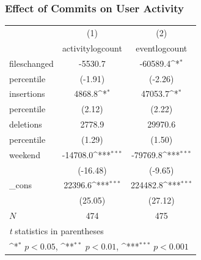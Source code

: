 \documentclass[xcolor=pdftex,dvipsnames,table]{beamer}
\begin{document}
\frame
{
    \frametitle{Effect of Commits on User Activity}
    \begin{table}
    \scriptsize
    \centering
    {
        \def\sym#1{\ifmmode^{#1}\else\(^{#1}\)\fi}
        \begin{tabular}{l*{2}{c}}
        \hline\hline
            &\multicolumn{1}{c}{(1)}&\multicolumn{1}{c}{(2)}\\
            &\multicolumn{1}{c}{activitylogcount}&\multicolumn{1}{c}{eventlogcount}\\
            \hline
            fileschanged&     -5530.7         &    -60589.4\sym{*}  \\
 percentile           &     (-1.91)         &     (-2.26)   \\
            [1em]
            insertions&      4868.8\sym{*}  &     47053.7\sym{*} \\
percentile
    &      (2.12)         &      (2.22)         \\
        [1em]
        deletions&      2778.9         &     29970.6    \\
        percentile&      (1.29)         &      (1.50)   \\
        [1em]
        weekend     &    -14708.0\sym{***}&    -79769.8\sym{***}\\
        &    (-16.48)         &     (-9.65)      \\
        [1em]
        \_cons      &     22396.6\sym{***}&    224482.8\sym{***}\\
        &     (25.05)         &     (27.12)      \\
        \hline
        \(N\)       &         474         &         475     \\
        \hline\hline
        \multicolumn{3}{l}{\textit{t} statistics in parentheses}\\
        \multicolumn{3}{l}{\sym{*} \(p<0.05\), \sym{**} \(p<0.01\), \sym{***} \(p<0.001\)}\\
        \end{tabular}
    }
    \end{table}
}
\end{document}
